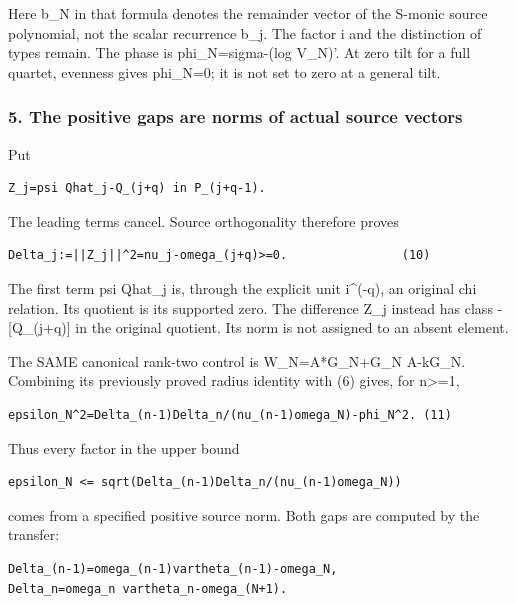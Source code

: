 Here b\_N in that formula denotes the remainder vector of the S-monic source polynomial, not the scalar recurrence b\_j. The factor i and the distinction of types remain. The phase is phi\_N=sigma-(log V\_N)'. At zero tilt for a full quartet, evenness gives phi\_N=0; it is not set to zero at a general tilt.

\subsubsection{5. The positive gaps are norms of actual source vectors}\label{endpoint-pr24_current_corrected--the-positive-gaps-are-norms-of-actual-source-vectors}

Put

\begin{verbatim}
Z_j=psi Qhat_j-Q_(j+q) in P_(j+q-1).
\end{verbatim}

The leading terms cancel. Source orthogonality therefore proves

\begin{verbatim}
Delta_j:=||Z_j||^2=nu_j-omega_(j+q)>=0.                (10)
\end{verbatim}

The first term psi Qhat\_j is, through the explicit unit i\^{}(-q), an original chi relation. Its quotient is its supported zero. The difference Z\_j instead has class -{[}Q\_(j+q){]} in the original quotient. Its norm is not assigned to an absent element.

The SAME canonical rank-two control is W\_N=A*G\_N+G\_N A-kG\_N. Combining its previously proved radius identity with (6) gives, for n\textgreater=1,

\begin{verbatim}
epsilon_N^2=Delta_(n-1)Delta_n/(nu_(n-1)omega_N)-phi_N^2. (11)
\end{verbatim}

Thus every factor in the upper bound

\begin{verbatim}
epsilon_N <= sqrt(Delta_(n-1)Delta_n/(nu_(n-1)omega_N))
\end{verbatim}

comes from a specified positive source norm. Both gaps are computed by the transfer:

\begin{verbatim}
Delta_(n-1)=omega_(n-1)vartheta_(n-1)-omega_N,
Delta_n=omega_n vartheta_n-omega_(N+1).
\end{verbatim}

